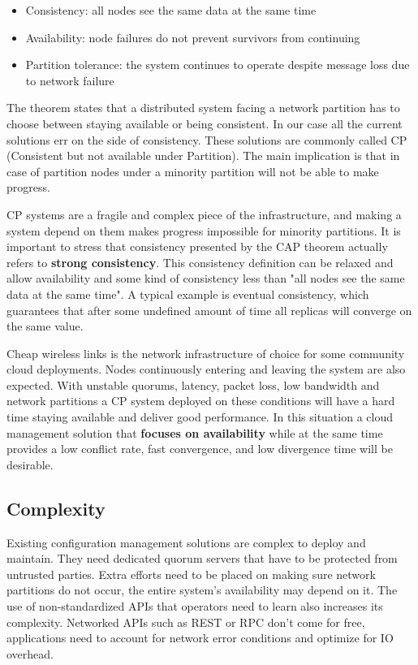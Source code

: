 \documentclass{sig-alternate}
\begin{document}
\begin{itemize}
\item Consistency: all nodes see the same data at the same time
\item Availability: node failures do not prevent survivors from continuing
\item Partition tolerance: the system continues to operate despite message loss due to network failure
\end{itemize}

The theorem states that a distributed system facing a network partition has to choose between staying available or being consistent. In our case all the current solutions err on the side of consistency. These solutions are commonly called CP (Consistent but not available under Partition). The main implication is that in case of partition nodes under a minority partition will not be able to make progress.

CP systems are a fragile and complex piece of the infrastructure, and making a system depend on them makes progress impossible for minority partitions. It is important to stress that consistency presented by the CAP theorem actually refers to \textbf{strong consistency}. This consistency definition can be relaxed and allow availability and some kind of consistency less than "all nodes see the same data at the same time". A typical example is eventual consistency, which guarantees that after some undefined amount of time all replicas will converge on the same value.

Cheap wireless links is the network infrastructure of choice for some community cloud deployments. Nodes continuously entering and leaving the system are also expected. With unstable quorums, latency, packet loss, low bandwidth and network partitions a CP system deployed on these conditions will have a hard time staying available and deliver good performance. In this situation a cloud management solution that \textbf{focuses on availability} while at the same time provides a low conflict rate, fast convergence, and low divergence time will be desirable.


\subsection{Complexity}

Existing configuration management solutions are complex to deploy and maintain. They need dedicated quorum servers that have to be protected from untrusted parties. Extra efforts need to be placed on making sure network partitions do not occur, the entire system's availability may depend on it. The use of non-standardized APIs that operators need to learn also increases its complexity. Networked APIs such as REST or RPC don't come for free, applications need to account for network error conditions and optimize for IO overhead.
\end{document}
